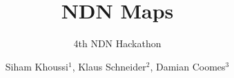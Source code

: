 \documentclass[12pt,nonotes]{beamer}
\author{Siham Khoussi$^1$, Klaus Schneider$^2$, Damian Coomes$^3$}
\title{NDN Maps}
\subtitle{4th NDN Hackathon}
\institute{$^1$NIST, $^2$The University of Arizona, $^3$The University of Memphis}
\begin{document}
\frame{\titlepage}

%

%
\end{document}
